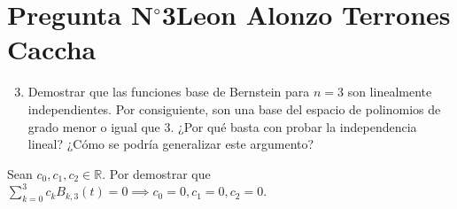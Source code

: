 \section{Pregunta N$^{\circ}$3\qquad Leon Alonzo Terrones Caccha}

\begin{frame}
    \begin{enumerate}\setcounter{enumi}{2}
        \item
              Demostrar que las funciones base de Bernstein para
              $n=3$ son linealmente independientes.
              Por consiguiente, son una base del espacio de
              polinomios de grado menor o igual que $3$.
              ¿Por qué basta con probar la independencia lineal?
              ¿Cómo se podría generalizar este argumento?
    \end{enumerate}

    \begin{solution}
        Sean $c_{0},c_{1},c_{2}\in\mathbb{R}$.
        Por demostrar que
        \begin{math}
            \sum\limits_{k=0}^{3}
            c_{k}
            B_{k,3}\left(t\right)=
            0\implies
            c_{0}=0,
            c_{1}=0,
            c_{2}=0
        \end{math}.


\end{solution}
\end{frame}

